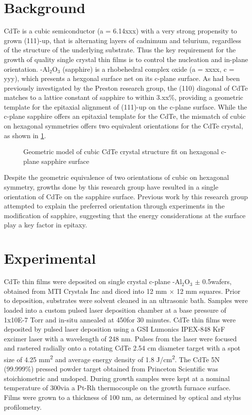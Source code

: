\section{Background}
CdTe is a cubic semiconductor (a = 6.14xxx) with a very strong propensity to grown 
(111)-up, that is 
alternating layers of cadnimum and telurium, regardless of the structure of the 
underlying substrate. Thus the key requirement for the growth of quality single crystal 
thin films is to control the nucleation and in-plane orientation. \textalpha-Al$_2$O$_3$ 
(sapphire) 
is a rhobehedral complex oxide (a = xxxx, c = yyy), which presents a hexgonal surface net 
on its c-plane surface. As had been previously investigated by the Preston research 
group, the (110) diagonal of CdTe matches to a lattice constant of sapphire to within 
3.xx\%, providing a geometric template for the epitaxial alignment of (111)-up on the 
c-plane surface. While the c-plane sapphire offers an epitaxial template for the CdTe, 
the mismatch of cubic on hexagonal symmetries offers two equivalent orientations for the 
CdTe crystal, as shown in \cref{fig:cdteliftoff_geometry}.
\begin{figure}
    \centering
    \caption{\label{fig:cdteliftoff_geometry}Geometric model of cubic CdTe crystal 
    structure fit on hexagonal c-plane sapphire surface}
\end{figure}
Despite the geometric equivalence of two orientations of cubic on hexagonal symmetry, 
growths done by this research group have resulted in a single orientation of CdTe on the 
sapphire surface. Previous work by this research group attempted to explain the preferred 
orientation through experiments in the modification of sapphire\cite{Neretina2009b}, 
suggesting that the energy considerations at the surface play a key factor in epitaxy.
\section{Experimental}
CdTe thin films were deposited on single crystal c-plane \textalpha-Al$_2$O$_3$ $\pm$ 
0.5\degree wafers, obtained from MTI Crystals Inc and diced into 12 mm $\times$ 12 mm 
squares. Prior to deposition, substrates were solvent cleaned in an ultrasonic bath. 
Samples were loaded into a custom pulsed laser deposition chamber at a base pressure of 
1x10E-7 Torr and in-situ annealed at 450\degree\celsius for 30 minutes. CdTe thin films 
were deposited by pulsed laser deposition using a GSI Lumonics IPEX-848 KrF excimer laser 
with a wavelength of 248 nm. Pulses from the laser were focused and rastered radially 
onto a rotating CdTe 2.54 cm diameter target with a spot size of 4.25 
mm\textsuperscript{2} and average 
energy density of 1.8 J/cm\textsuperscript{2}. The CdTe 5N (99.999\%) pressed powder 
target obtained from 
Princeton Scientific was stoichiometric and undoped. During growth samples were kept at a 
nominal temperature of 300\degree\celsius via a Pt-Rh thermocouple on the growth furnace 
surface. 
Films were grown to a thickness of 100 nm, as determined by optical and stylus 
profilometry.

